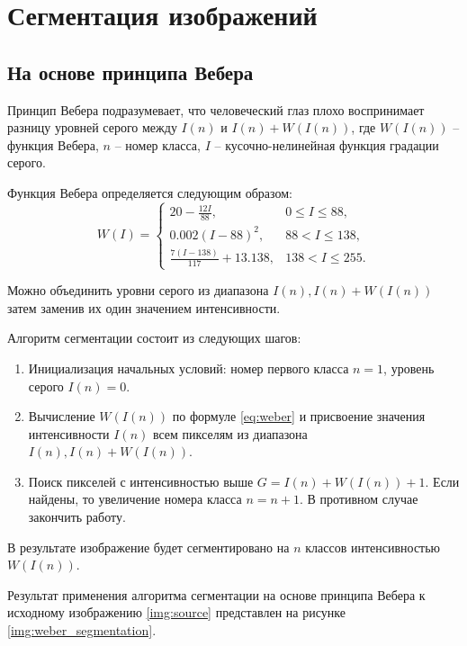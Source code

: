\section{Сегментация изображений}

\subsection{На основе принципа Вебера}

Принцип Вебера подразумевает, что человеческий глаз плохо воспринимает разницу 
уровней серого между $I(n)$ и $I(n) + W(I(n))$, где $W(I(n))$ -- функция Вебера, 
$n$ -- номер класса, $I$ -- кусочно-нелинейная функция градации серого. 

Функция Вебера определяется следующим образом:
\begin{equation}
    W(I) = \begin{cases}
        20 - \frac{12I}{88}, & 0 \le I \le 88, \\
        0.002 (I - 88)^2, & 88 < I \le 138, \\
        \frac{7(I - 138)}{117} + 13.138, & 138 < I \le 255.
    \end{cases}
    \label{eq:weber}
\end{equation}

Можно объединить уровни серого из диапазона $I(n), I(n) + W(I(n))$ затем заменив их один значением интенсивности. 

Алгоритм сегментации состоит из следующих шагов:
\begin{enumerate}
    \item Инициализация начальных условий: номер первого класса $n = 1$, уровень серого $I(n) = 0$. 
    \item Вычисление $W(I(n))$ по формуле \eqref{eq:weber} и присвоение значения интенсивности $I(n)$ всем пикселям из диапазона $I(n), I(n) + W(I(n))$.
    \item Поиск пикселей с интенсивностью выше $G = I(n) + W(I(n)) + 1$. Если найдены, то увеличение номера класса $n = n + 1$. В противном случае закончить работу. 
\end{enumerate}

В результате изображение будет сегментировано на $n$ классов интенсивностью $W(I(n))$. 

Результат применения алгоритма сегментации на основе принципа Вебера к исходному изображению \ref{img:source} представлен на рисунке \ref{img:weber_segmentation}.

